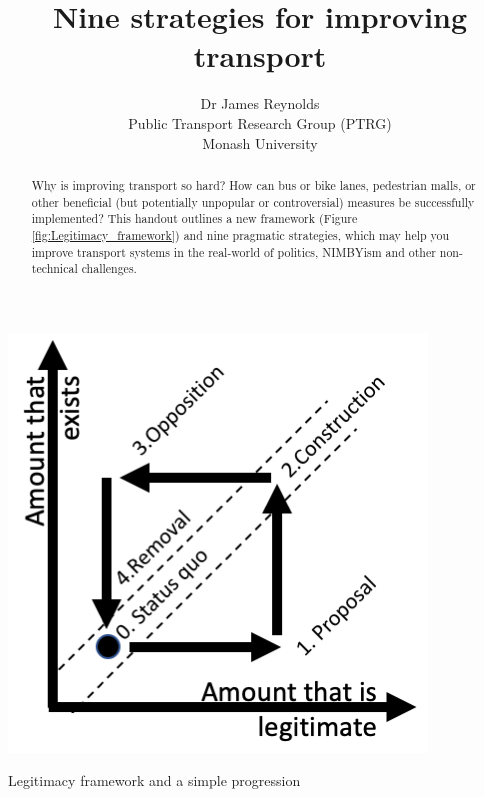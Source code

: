 \documentclass{tufte-handout}
\title{Nine strategies for improving transport}
\author{Dr James Reynolds \\ Public Transport Research Group (PTRG) \\ Monash University}
\begin{document}
\maketitle%


\begin{marginfigure}%
  \includegraphics[width=\linewidth]{Framework_and_progression}
  \caption{Legitimacy framework and a simple progression}
  \label{fig:Legitimacy_framework}
\end{marginfigure}
  


\begin{abstract}
\noindent
Why is improving transport so hard? How can bus or bike lanes, pedestrian malls, or other beneficial (but potentially unpopular or controversial) measures be successfully implemented? This handout outlines a new framework (Figure \ref{fig:Legitimacy_framework}) and nine pragmatic strategies, which may help you improve transport systems in the real-world of politics, NIMBYism and other non-technical challenges.
\end{abstract}
\end{document}
